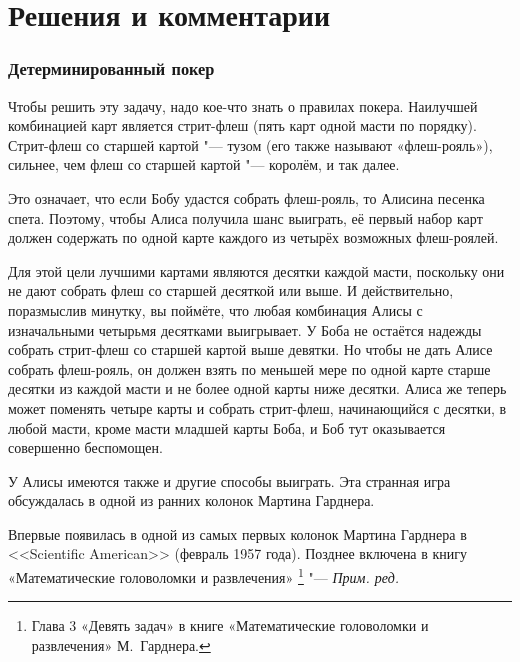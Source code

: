 \documentclass[twoside]{book}
\newenvironment{addedbytheeditors}{\par\medskip\small
}{\par\addvspace{\medskipamount}} %
\begin{document}

\section*{Решения и комментарии}

\subsubsection*{Детерминированный покер}%

Чтобы решить эту задачу, надо кое-что знать о правилах
покера. Наилучшей комбинацией карт является стрит-флеш (пять
карт одной масти по порядку).
Стрит-флеш со старшей картой "--- тузом (его
также называют «флеш-рояль»), сильнее, чем флеш со старшей картой "---  королём, и
так далее.

Это означает, что если Бобу удастся собрать флеш-рояль, то Алисина песенка спета.
Поэтому, чтобы Алиса получила шанс выиграть, её первый набор карт должен содержать по одной карте каждого из четырёх возможных флеш-роялей.

Для этой цели лучшими картами являются десятки каждой масти, поскольку
они не дают собрать флеш со старшей десяткой или выше.
И действительно, поразмыслив минутку, вы поймёте, что любая комбинация Алисы с изначальными четырьмя десятками выигрывает.
У Боба не остаётся надежды собрать стрит-флеш со старшей картой выше девятки.
Но чтобы не дать Алисе собрать флеш-рояль, он должен взять по меньшей мере по одной карте старше десятки из каждой масти и не более одной карты ниже десятки.
Алиса же теперь может поменять четыре карты и собрать стрит-флеш, начинающийся с десятки, в любой масти, кроме масти младшей карты Боба,
и Боб тут оказывается совершенно беспомощен.
\heart

\medskip
У Алисы имеются также и другие способы выиграть.
Эта странная игра обсуждалась в одной из ранних колонок Мартина
Гарднера. 

\begin{addedbytheeditors}
Впервые появилась в одной из самых первых колонок Мартина Гарднера в <<{Scientific American}>> (февраль 1957 года).
Позднее включена в книгу «Математические головоломки и развлечения»%
\footnote{Глава 3 «Девять задач» в книге «Математические головоломки и развлечения» М.~Гарднера.}
"--- \emph{Прим. ред.}  
\end{addedbytheeditors}
\end{document}
